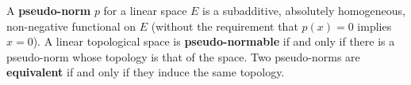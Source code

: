 A \textbf{pseudo-norm} $p$ for a linear space $E$ is a subadditive, absolutely homogeneous, non-negative functional on $E$ (without the requirement that $p(x) = 0$ implies $x = 0$). A linear topological space is \textbf{pseudo-normable} if and only if there is a pseudo-norm whose topology is that of the space. Two pseudo-norms are \textbf{equivalent} if and only if they induce the same topology.
